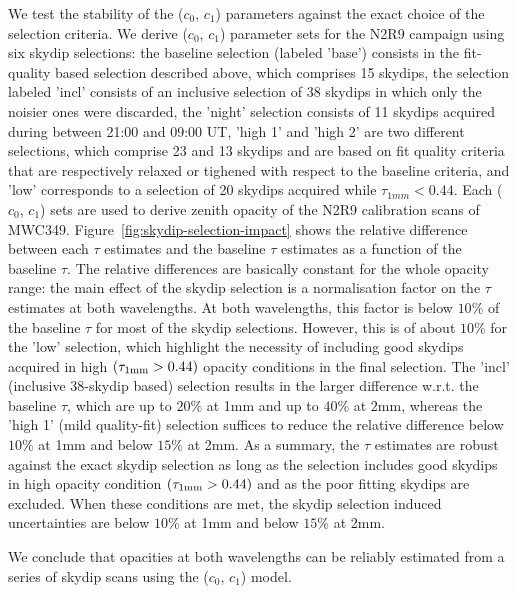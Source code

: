 


We test the stability of the ($c_0$, $c_1$) parameters against the
exact choice of the selection criteria.
We derive ($c_0$, $c_1$) parameter sets for the N2R9 campaign using
six skydip selections: the baseline selection (labeled 'base')
consists in the fit-quality based selection described above, which
comprises 15 skydips, the selection labeled 'incl' consists of an
inclusive selection of 38 skydips in which only the noisier ones were
discarded, the 'night' selection consists of 11 skydips acquired during
between 21:00 and 09:00 UT,
'high 1' and 'high 2' are two different selections, which comprise 23
and 13 skydips and are based on fit quality criteria that are
respectively relaxed or tighened with respect to the baseline criteria, 
and 'low' corresponds to a selection of 20 skydips acquired while
$\tau_{1mm} < 0.44$. Each ($c_0$, $c_1$) sets are used to derive
zenith opacity of the N2R9 calibration scans of MWC349. 
Figure~\ref{fig:skydip-selection-impact} shows the relative
difference between each $\tau$ estimates and the baseline $\tau$
estimates as a function of the baseline $\tau$. The relative
differences are basically constant for the whole opacity range: the
main effect of the skydip selection is a normalisation factor on the
$\tau$ estimates at both wavelengths. At both wavelengths, this factor
is below $10\%$ of the baseline $\tau$ for most of the skydip
selections. However, this is of about $10\%$ for the 'low' selection,
which highlight the necessity of including good skydips acquired in
high $(\tau_{1\rm{mm}} > 0.44)$ opacity conditions in the final
selection. The 'incl' (inclusive 38-skydip based) selection results in the larger
difference w.r.t. the baseline $\tau$, which are up to $20\%$ at 1mm
and up to $40\%$ at $2$mm, whereas the 'high 1' (mild quality-fit)
selection suffices to reduce the relative difference below $10\%$ at
1mm and below $15\%$ at 2mm.
As a summary, the $\tau$ estimates are robust against the exact skydip
selection as long as the selection includes good
skydips in high opacity condition $(\tau_{1\rm{mm}} > 0.44)$ and as the poor
fitting skydips are excluded. When these conditions are met, the
skydip selection induced uncertainties are below $10\%$ at 1mm and
below $15\%$ at 2mm. 

We conclude that opacities at both wavelengths can be reliably
estimated from a series of skydip scans using the ($c_0$, $c_1$) model.



